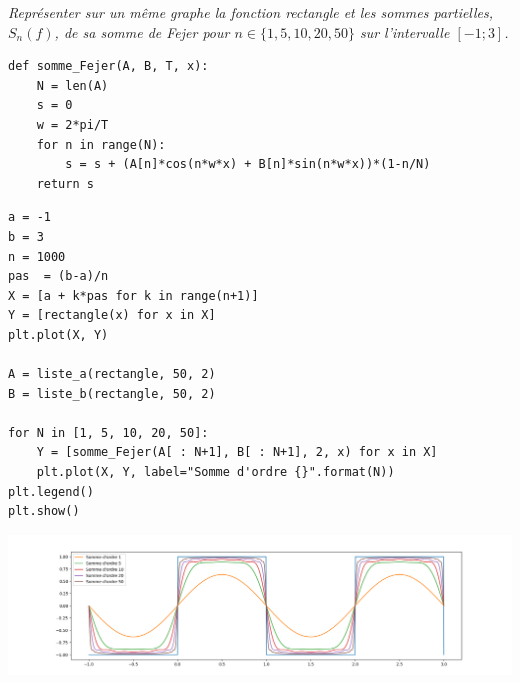 \begin{Exercise}\it
Représenter sur un même graphe la fonction rectangle et les sommes partielles, $S_n(f)$, de sa somme de Fejer pour $n\in \{1, 5, 10, 20, 50\}$ sur l'intervalle $[-1;3]$.
\end{Exercise}
\begin{Answer}
\begin{lstlisting}
def somme_Fejer(A, B, T, x):
    N = len(A)
    s = 0
    w = 2*pi/T
    for n in range(N):
        s = s + (A[n]*cos(n*w*x) + B[n]*sin(n*w*x))*(1-n/N)
    return s
\end{lstlisting}
\newpage
\begin{lstlisting}
a = -1
b = 3
n = 1000
pas  = (b-a)/n
X = [a + k*pas for k in range(n+1)]
Y = [rectangle(x) for x in X]
plt.plot(X, Y)

A = liste_a(rectangle, 50, 2)
B = liste_b(rectangle, 50, 2)

for N in [1, 5, 10, 20, 50]:
    Y = [somme_Fejer(A[ : N+1], B[ : N+1], 2, x) for x in X]
    plt.plot(X, Y, label="Somme d'ordre {}".format(N))
plt.legend()
plt.show()
\end{lstlisting}
\begin{center}
\includegraphics[scale=0.4]{TP/Images/TP19_rectangle_Fejer.png}
\end{center}
\end{Answer}
